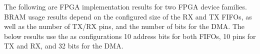 The following are FPGA implementation results for two FPGA device families. 
BRAM usage results depend on the configured size of the RX and TX FIFOs, as well as
the number of TX/RX pins, and the number of bits for the DMA. The below results
use the as configurations 10 address bits for both FIFOs, 10 pins for TX and RX,
and 32 bits for the DMA.


